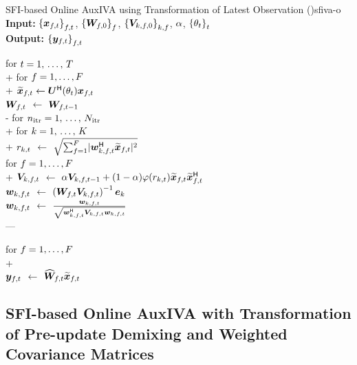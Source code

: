 \documentclass[sip,biber]{now-journal}
\begin{document}
\begin{algorithm}{SFI-based Online AuxIVA using Transformation of Latest Observation (\SFIIVAo)}{sfiva-o}
  \textbf{Input:} ${\{\Obs _{\ft}\}} _{\ft}$, ${\{\bm{W} _{f,0}\}} _{f}$, ${\{\bm{V} _{k,f,0}\}} _{k,f}$, $\alpha$, ${\{\theta _{t}\}} _{t}$ \\
  \textbf{Output:} ${\{\Est _{\ft}\}} _{\ft}$
  \begin{pseudo}
    for $t = 1,\, \dots,\, T$ \\+
      for $f = 1, \dots, F$ \\+
        $\refpos{\Obs} _{\ft} \gets \rotMat ^{\hermite} (\rotSpat _{\tframe}) \Obs _{\ft}$ \ct{\eqref{eq:sfi:obs}} \\
        {$\Demix _{\ft}$} $\gets$ $\Demix _{\ft[-1]}$ \\-
      for $n _{\mathrm{itr}} = 1,\, \dots,\, N _{\mathrm{itr}}$ \\+
        for $k = 1,\, \dots,\, K$ \\+
          {$r _{k,t}$} $\gets$ $\sqrt{\sum _{\freq = 1} ^{\Freq} \abs{\demix _{\src,\ft} ^{\hermite} \refpos{\Obs} _{\ft}} ^2}$ \ct{\eqref{eq:var}} \\
          for $f = 1, \dots, F$ \\+
            {$\cov _{\src,\ft}    $} $\gets$ $\forget \cov _{\src,\ft[-1]} + (1 - \forget) \weight(\var _{\src,\tframe}) \refpos{\Obs} _{\ft} \refpos{\Obs} _{\ft} ^{\hermite}$ \ct{\eqref{eq:cov:rot}} \\
            {$\demix _{\src,\ft}$} $\gets$ $\left(\Demix _{\ft} \cov _{\src,\ft}\right) ^{-1} \eye _{\src}$ \ct{\eqref{eq:ip:proj}} \\
            {$\demix _{\src,\ft}$} $\gets$ $\frac{\demix _{\src,\ft}}{\sqrt{\demix _{\src,\ft} ^{\hermite} \cov _{\src,\ft} \demix _{\src,\ft}}}$ \ct{\eqref{eq:ip:norm}} \\---

      for $f = 1, \dots, F$ \\+
         \ct{\eqref{eq:pb:w}}\\
        {$\Est _{\ft}$} $\gets$ $\proj{\Demix }_{\ft} \refpos{\Obs} _{\ft}$ \ct{\eqref{eq:pb:y}}
  \end{pseudo}
\end{algorithm}

\subsection{SFI-based Online AuxIVA with Transformation of Pre-update Demixing and Weighted Covariance Matrices}\label{subsec:proposed:sfiivam}
\end{document}
